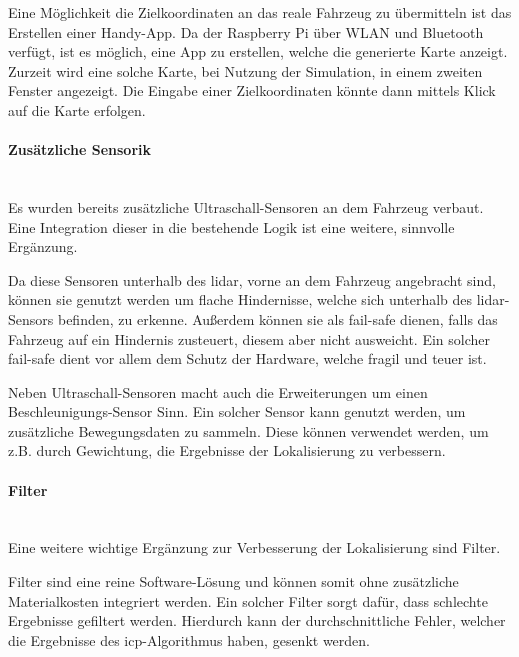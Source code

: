 Eine Möglichkeit die Zielkoordinaten an das reale Fahrzeug zu übermitteln ist das Erstellen einer Handy-App.
Da der Raspberry Pi über WLAN und Bluetooth verfügt, ist es möglich, eine App zu erstellen, welche die generierte Karte anzeigt.
Zurzeit wird eine solche Karte, bei Nutzung der Simulation, in einem zweiten Fenster angezeigt.
Die Eingabe einer Zielkoordinaten könnte dann mittels Klick auf die Karte erfolgen.

\paragraph{Zusätzliche Sensorik} \mbox{}\\
Es wurden bereits zusätzliche Ultraschall-Sensoren an dem Fahrzeug verbaut.
Eine Integration dieser in die bestehende Logik ist eine weitere, sinnvolle Ergänzung.

Da diese Sensoren unterhalb des \ac{lidar}, vorne an dem Fahrzeug angebracht sind,
können sie genutzt werden um flache Hindernisse, welche sich unterhalb des \ac{lidar}-Sensors befinden, zu erkenne.
Außerdem können sie als fail-safe dienen, falls das Fahrzeug auf ein Hindernis zusteuert, diesem aber nicht ausweicht.
Ein solcher fail-safe dient vor allem dem Schutz der Hardware, welche fragil und teuer ist.

Neben Ultraschall-Sensoren macht auch die Erweiterungen um einen Be\-schleunigungs-Sensor Sinn.
Ein solcher Sensor kann genutzt werden, um zu\-sätzliche Bewegungsdaten zu sammeln.
Diese können verwendet werden, um z.B. durch Gewichtung, die Ergebnisse der Lokalisierung zu verbessern.

\paragraph{Filter} \mbox{}\\
Eine weitere wichtige Ergänzung zur Verbesserung der Lokalisierung sind Filter.

Filter sind eine reine Software-Lösung und können somit ohne zusätzliche Materialkosten integriert werden.
Ein solcher Filter sorgt dafür, dass schlechte Ergebnisse gefiltert werden.
Hierdurch kann der durchschnittliche Fehler, welcher die Ergebnisse des \ac{icp}-Algorithmus haben, gesenkt werden.

\newpage
